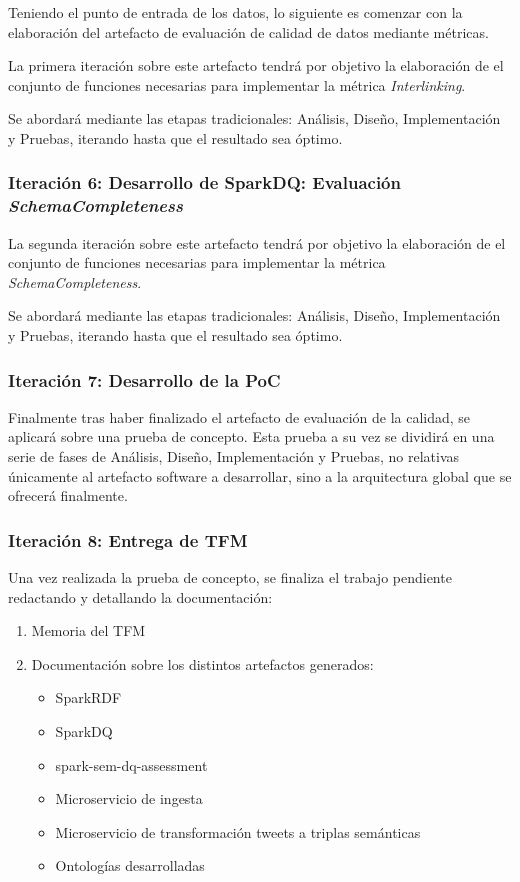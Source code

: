 Teniendo el punto de entrada de los datos, lo siguiente es comenzar con la
elaboración del artefacto de evaluación de calidad de datos mediante
métricas.

La primera iteración sobre este artefacto tendrá por objetivo la elaboración de
el conjunto de funciones necesarias para implementar la métrica
\textit{Interlinking}.

Se abordará mediante las etapas tradicionales: Análisis, Diseño,
Implementación y Pruebas, iterando hasta que el resultado sea óptimo. 



\subsubsection{Iteración 6: Desarrollo de SparkDQ: Evaluación
  \textit{SchemaCompleteness}}


La segunda iteración sobre este artefacto tendrá por objetivo la elaboración de
el conjunto de funciones necesarias para implementar la métrica
\textit{SchemaCompleteness}.

Se abordará mediante las etapas tradicionales: Análisis, Diseño,
Implementación y Pruebas, iterando hasta que el resultado sea óptimo. 



\subsubsection{Iteración 7: Desarrollo de la \acs{PoC}}

Finalmente tras haber finalizado el artefacto de evaluación de la calidad, se
aplicará sobre una prueba de concepto. Esta prueba a su vez se dividirá en una
serie de fases de Análisis, Diseño, Implementación y Pruebas, no relativas
únicamente al artefacto software a desarrollar, sino a la arquitectura global
que se ofrecerá finalmente. 




\subsubsection{Iteración 8: Entrega de \acs{TFM}}

Una vez realizada la prueba de concepto, se finaliza el trabajo pendiente
redactando y detallando la documentación:

\begin{enumerate}
\item Memoria del \acs{TFM}
\item Documentación sobre los distintos artefactos generados:
  \begin{itemize}
  \item SparkRDF
  \item SparkDQ
  \item spark-sem-dq-assessment
  \item Microservicio de ingesta
  \item Microservicio de transformación tweets a triplas semánticas
  \item Ontologías desarrolladas
  \end{itemize}
\end{enumerate}

